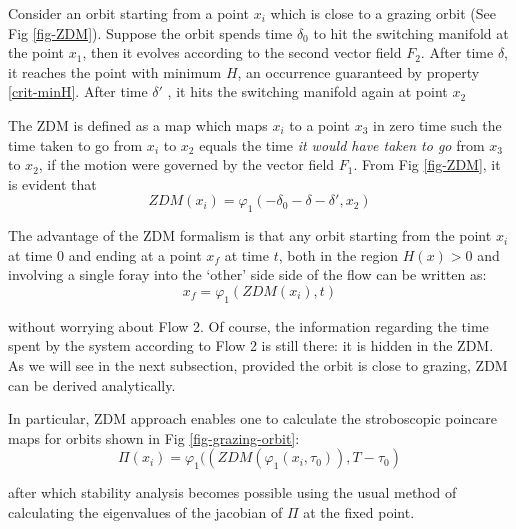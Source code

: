 \documentclass{book}
\renewcommand{\(}{\begin{columns}}
\renewcommand{\)}{\end{columns}}
\newcommand{\<}[1]{\begin{column}{#1}}
\renewcommand{\>}{\end{column}}
\begin{document}
Consider an orbit starting from a point $x_i$ which is close to a grazing 
orbit (See Fig \ref{fig-ZDM}). Suppose the orbit spends time $\delta_0$ to hit 
the switching manifold at the point $x_1$, then it evolves according to the 
second vector field $F_2$.  After time $\delta$, it reaches the point with 
minimum $H$, an occurrence guaranteed by property \ref{crit-minH}. After time 
$\delta'$ , it hits the switching manifold again at point $x_2$


The ZDM is defined as a map which maps $x_i$ to a point $x_3$ in zero time 
such the time taken to go from $x_i$ to $x_2$ equals the time \emph{it would 
have taken to go} from 
$x_3$ to $x_2$, if the motion were governed by the vector field $F_1$.   From Fig \ref{fig-ZDM}, it is evident that \[
ZDM(x_i)=\varphi_1(-\delta_0-\delta-\delta',x_2)
\] 

The advantage of the ZDM formalism is that any orbit starting from the point 
$x_i$ at time $0$ and ending at a point $x_f$ at time $t$, both in the region $H(x)>0$ and involving a single foray 
into the `other' side side of the flow can be written as:
\begin{equation}
\label{trajeq-ZDM}
x_f=\varphi_1(ZDM(x_i),t)
\end{equation}

without worrying about Flow 2. Of course, the information regarding the time  
spent  by the system according to Flow 2 is still there: it is hidden in the ZDM.  As 
we will see in the next subsection, provided the orbit is close to grazing, 
ZDM can be derived analytically.  

In particular, ZDM approach enables one to calculate the stroboscopic poincare 
maps for orbits shown in Fig \ref{fig-grazing-orbit}:
\begin{equation}
\label{eq-pmap-ZDM}
\Pi(x_i)=\varphi_1((ZDM(\varphi_1(x_i,\tau_0)),T-\tau_0)
\end{equation}

after which stability analysis becomes possible using the usual method of 
calculating the eigenvalues of the jacobian of $\Pi$ at the fixed point.  

\end{document}
